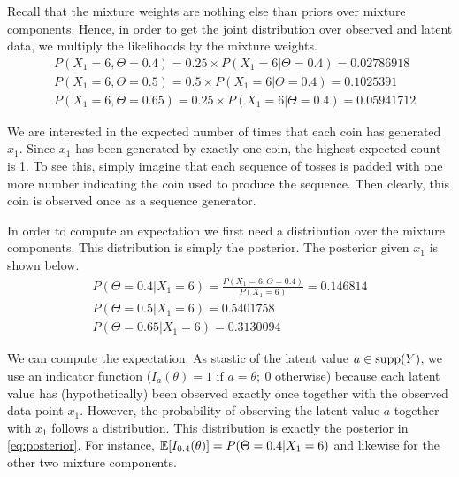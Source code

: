 Recall that the mixture weights are nothing else than priors over mixture components. Hence, in order to get the joint distribution over observed and
latent data, we multiply the likelihoods by the mixture weights.
\begin{align}
&P(X_{1}=6,\Theta=0.4) = 0.25 \times P(X_{1}=6|\Theta=0.4) = 0.02786918 \\
&P(X_{1}=6,\Theta=0.5) = 0.5 \times P(X_{1}=6|\Theta=0.4)  = 0.1025391 \nonumber \\ 
&P(X_{1}=6,\Theta=0.65) =  0.25 \times P(X_{1}=6|\Theta=0.4)  = 0.05941712 \nonumber
\end{align}

We are interested in the expected number of times that each coin has generated $ x_{1} $. Since $ x_{1} $ has been generated by exactly one coin,
the highest expected count is 1. To see this, simply imagine that each sequence of tosses is padded with one more number indicating the coin
used to produce the sequence. Then clearly, this coin is observed once as a sequence generator.

In order to compute an expectation we first need a distribution over the mixture components. This distribution is simply the posterior. The
posterior given $ x_{1} $ is shown below.
\begin{align}\label{eq:posterior}
P(\Theta=0.4|X_{1}=6) = \frac{P(X_{1}=6,\Theta=0.4)}{P(X_1 = 6)} = 0.146814 \\
P(\Theta=0.5|X_{1}=6) = 0.5401758 \nonumber \\
P(\Theta=0.65|X_{1}=6) = 0.3130094 \nonumber
\end{align}

We can compute the expectation. As stastic of the latent value $a \in \operatorname{supp}(Y)$, we use an indicator function ($ I_{a}(\theta) = 1 \mbox{ if } a=\theta;~0 $ otherwise) 
because each latent value has (hypothetically) been observed exactly once
together with the observed data point $ x_{1} $. However, the probability of observing the latent value $a$ together with $ x_{1} $ follows a distribution.
This distribution is exactly the posterior in \eqref{eq:posterior}. For instance, $ \mathbb{E}[I_{0.4}(\theta)] = P(\Theta=0.4|X_{1}=6) $ and likewise for the
other two mixture components.

